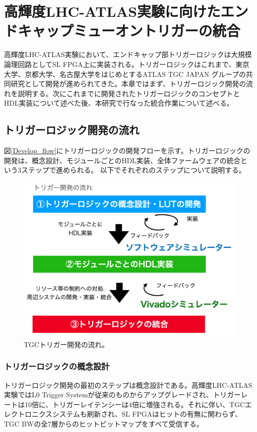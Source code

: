 \chapter{高輝度LHC-ATLAS実験に向けたエンドキャップミューオントリガーの統合}
\label{chap_TriggerIntegration}
高輝度LHC-ATLAS実験において、エンドキャップ部トリガーロジックは大規模論理回路としてSL FPGA上に実装される。トリガーロジックはこれまで、東京大学、京都大学、名古屋大学をはじめとするATLAS TGC JAPAN グループの共同研究として開発が進められてきた。本章ではまず、トリガーロジック開発の流れを説明する。次にこれまでに開発されたトリガーロジックのコンセプトとHDL実装について述べた後、本研究で行なった統合作業について述べる。

\section{トリガーロジック開発の流れ}
\label{sec_TriggerTestSystem}
図\ref{Develop_flow}にトリガーロジックの開発フローを示す。トリガーロジックの開発は、概念設計、モジュールごとのHDL実装、全体ファームウェアの統合という3ステップで進められる。
以下でそれぞれのステップについて説明する。

\begin{figure} 
\centering
\includegraphics[width=16cm]{fig/SL/Trigger_flow.png}
\caption[TGCトリガー開発の流れ]{TGCトリガー開発の流れ。}
\label{Trigger_flow}
\end{figure}

\subsection*{トリガーロジックの概念設計}
トリガーロジック開発の最初のステップは概念設計である。高輝度LHC-ATLAS実験ではL0 Trigger Systemが従来のものからアップグレードされ、トリガーレートは10倍に、トリガーレイテンシーは4倍に増強される。それに伴い、TGCエレクトロニクスシステムも刷新され、SL FPGAはヒットの有無に関わらず、TGC BWの全7層からのヒットビットマップをすべて受信する。

